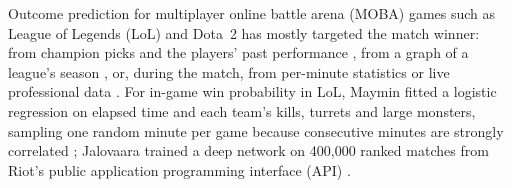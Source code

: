 Outcome prediction for multiplayer online battle arena (MOBA) games such as League of Legends (LoL)
and Dota~2 has mostly targeted the match winner: from champion picks and the players'
past performance \cite{costa2021,hitar2023}, from a graph of a league's season \cite{bisberg2022}, or,
during the match, from per-minute statistics \cite{silva2018continuous} or live professional data
\cite{hodge2021win}.
For in-game win probability in LoL, Maymin fitted a logistic regression on elapsed time and each
team's kills, turrets and large monsters, sampling one random minute per game because consecutive
minutes are strongly correlated \cite{maymin2021smart}; Jalovaara trained a deep network on 400,000
ranked matches from Riot's public application programming interface (API) \cite{jalovaara2024win}.
